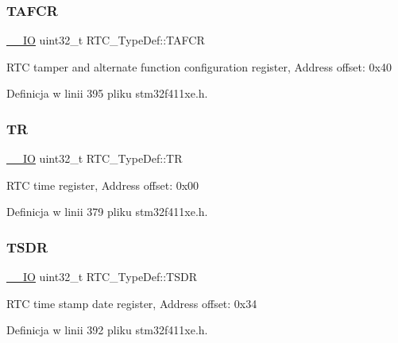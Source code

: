 \subsubsection{\texorpdfstring{T\+A\+F\+CR}{TAFCR}}
{\footnotesize\ttfamily \hyperlink{core__sc300_8h_aec43007d9998a0a0e01faede4133d6be}{\+\_\+\+\_\+\+IO} uint32\+\_\+t R\+T\+C\+\_\+\+Type\+Def\+::\+T\+A\+F\+CR}

R\+TC tamper and alternate function configuration register, Address offset\+: 0x40 

Definicja w linii 395 pliku stm32f411xe.\+h.

\mbox{\label{struct_r_t_c___type_def_a2e8783857f8644a4eb80ebc51e1cba42}} 
\subsubsection{\texorpdfstring{TR}{TR}}
{\footnotesize\ttfamily \hyperlink{core__sc300_8h_aec43007d9998a0a0e01faede4133d6be}{\+\_\+\+\_\+\+IO} uint32\+\_\+t R\+T\+C\+\_\+\+Type\+Def\+::\+TR}

R\+TC time register, Address offset\+: 0x00 

Definicja w linii 379 pliku stm32f411xe.\+h.

\mbox{\label{struct_r_t_c___type_def_aa4633dbcdb5dd41a714020903fd67c82}} 
\subsubsection{\texorpdfstring{T\+S\+DR}{TSDR}}
{\footnotesize\ttfamily \hyperlink{core__sc300_8h_aec43007d9998a0a0e01faede4133d6be}{\+\_\+\+\_\+\+IO} uint32\+\_\+t R\+T\+C\+\_\+\+Type\+Def\+::\+T\+S\+DR}

R\+TC time stamp date register, Address offset\+: 0x34 

Definicja w linii 392 pliku stm32f411xe.\+h.

\mbox{\label{struct_r_t_c___type_def_a1e8b4b987496ee1c0c6f16b0a94ea1a1}} 
